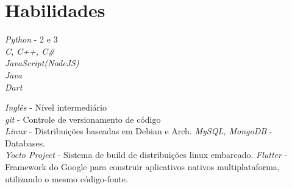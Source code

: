 \documentclass[10pt]{article} %
\begin{document}

\section{Habilidades}

{
\textit{Python} - 2 e 3\\
\textit{C, C++, C\#}\\
\textit{JavaScript(NodeJS)}\\
\textit{Java}\\
\textit{Dart}\\
}


{
\textit{Inglês} - Nível intermediário\\
\textit{git} - Controle de versionamento de código\\
\textit{Linux} - Distribuições baseadas em Debian e Arch.
\textit{MySQL, MongoDB} - Databases.\\
\textit{Yocto Project} - Sistema de build  de distribuições linux embarcado.
\textit{Flutter} - Framework do Google para construir aplicativos nativos multiplataforma, utilizando o mesmo código-fonte.
}



\end{document}
